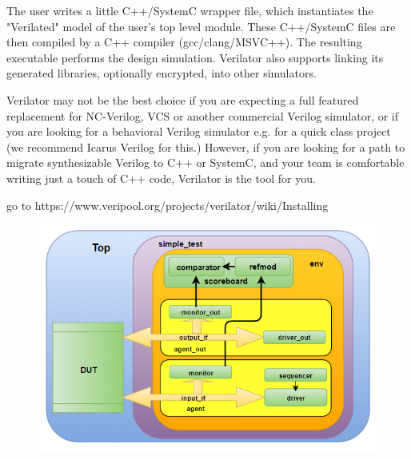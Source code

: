 \documentclass{article}
\begin{document}
The user writes a little C++/SystemC wrapper file, which instantiates the "Verilated" model of the user’s top level module. These C++/SystemC files are then compiled by a C++ compiler (gcc/clang/MSVC++). The resulting executable performs the design simulation. Verilator also supports linking its generated libraries, optionally encrypted, into other simulators.

Verilator may not be the best choice if you are expecting a full featured replacement for NC-Verilog, VCS or another commercial Verilog simulator, or if you are looking for a behavioral Verilog simulator e.g. for a quick class project (we recommend Icarus Verilog for this.) However, if you are looking for a path to migrate synthesizable Verilog to C++ or SystemC, and your team is comfortable writing just a touch of C++ code, Verilator is the tool for you.

go to https://www.veripool.org/projects/verilator/wiki/Installing

  \begin{figure}[h]
    \includegraphics[width=0.6\linewidth]{pictures/uvm.png}
    \label{uvm_tb}
  \end{figure}
        
\newpage


\end{document}
